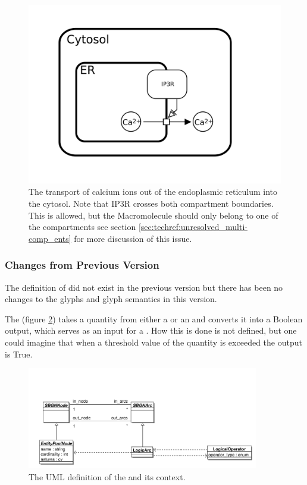 \begin{figure}[htb]
  \centering
  \includegraphics[scale = 0.3]{examples/necessary_stim-transport}
  \caption{The transport of calcium ions out of the endoplasmic
    reticulum into the cytosol. Note that IP3R crosses both
    compartment boundaries. This is allowed, but the Macromolecule
    should only belong to one of the compartments see section
    \ref{sec:techref:unresolved_multi-comp_ents} for more discussion of this
    issue.}
  \label{fig:techref:necessary_stim-calcium}
\end{figure}

\subsubsection{Changes from Previous Version}

The definition of  did not exist in the
previous version but there has been no changes to the glyphs and glyph
semantics in this version.

\label{defn:LogicArc}

The  (figure \ref{fig:techref:logicarcuml}) takes a quantity from either a
 or an  and
converts it into a Boolean output, which serves as an input for a
. How this is done is not defined, but one
could imagine that when a threshold value of the quantity is exceeded
the output is True.

\begin{figure}[htb]
  \centering
  \includegraphics[width = 0.9\textwidth]{images/logicarcuml}
  \caption{The UML definition of the  and its context.}
  \label{fig:techref:logicarcuml}
\end{figure}


